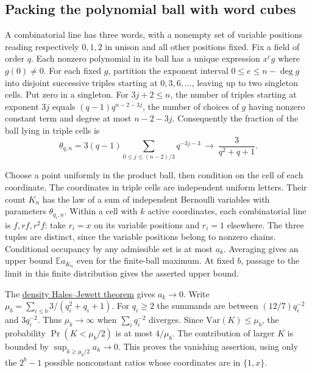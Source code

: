 \subsection{Packing the polynomial ball with word cubes}
A combinatorial line has three words, with a nonempty set of variable
positions reading respectively $0,1,2$ in unison and all other positions
fixed. Fix a field of order $q$. Each nonzero polynomial in its ball
has a unique expression $x^eg$ where $g(0)\ne0$. For each fixed $g$,
partition the exponent interval $0\le e\le n-\deg g$ into disjoint
successive triples starting at $0,3,6,\ldots$, leaving up to two singleton
cells. Put zero in a singleton. For $3j+2\le n$, the number of triples
starting at exponent $3j$ equals $(q-1)q^{n-2-3j}$, the number of choices
of $g$ having nonzero constant term and degree at most $n-2-3j$.
Consequently the fraction of the ball lying in triple cells is
\[
 \theta_{q,n}=3(q-1)\sum_{0\le j\le(n-2)/3}q^{-3j-3}
 \ \longrightarrow\ \frac{3}{q^2+q+1}.
\]

Choose a point uniformly in the product ball, then condition on the cell
of each coordinate. The coordinates in triple cells are independent
uniform letters. Their count $K_n$ has the law of a sum of independent
Bernoulli variables with parameters $\theta_{q_i,n}$. Within a cell
with $k$ active coordinates, each combinatorial line is
$f,rf,r^2f$: take $r_i=x$ on its variable positions and $r_i=1$
elsewhere. The three tuples are distinct, since the variable positions
belong to nonzero chains. Conditional occupancy by any admissible set
is at most $a_k$. Averaging gives an upper bound $\mathbb E a_{K_n}$
even for the finite-ball maximum. At fixed $b$, passage to the limit in
this finite distribution gives the asserted upper bound.

The \href{https://annals.math.princeton.edu/2012/175-3/p06}{density
Hales--Jewett theorem} gives $a_k\to0$. Write
$\mu_b=\sum_{i\le b}3/(q_i^2+q_i+1)$. For $q_i\ge2$ the summands
are between $(12/7)q_i^{-2}$ and $3q_i^{-2}$. Thus $\mu_b\to\infty$
when $\sum_iq_i^{-2}$ diverges. Since $\mathrm{Var}(K)\le\mu_b$,
the probability $\Pr(K<\mu_b/2)$ is at most $4/\mu_b$. The contribution
of larger $K$ is bounded by $\sup_{k\ge\mu_b/2}a_k\to0$. This proves the
vanishing assertion, using only the $2^b-1$ possible nonconstant ratios
whose coordinates are in $\{1,x\}$.

